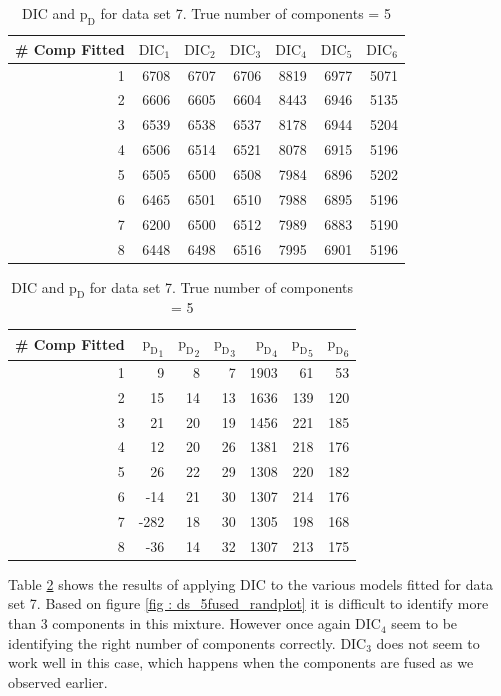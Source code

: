 \begin{table}[!htb]
\centering
\caption{DIC and $\text{p}_\text{D}$ for data set 7. True number of components = 5}
\label{table : ds_5fused_dic}
\begin{tabular}{@{}rrrrrrr@{}}
\toprule
\# Comp Fitted & $\text{DIC}_1$ & $\text{DIC}_2$  & $\text{DIC}_3$  & $\text{DIC}_4$  & $\text{DIC}_5$  & $\text{DIC}_6$  \\ \midrule
1 & 6708 & 6707 & 6706 & 8819 & 6977 & 5071 \\
2 & 6606 & 6605 & 6604 & 8443 & 6946 & 5135 \\
3 & 6539 & 6538 & 6537 & 8178 & 6944 & 5204 \\
4 & 6506 & 6514 & 6521 & 8078 & 6915 & 5196 \\
5 & 6505 & 6500 & 6508 & 7984 & 6896 & 5202 \\
6 & 6465 & 6501 & 6510 & 7988 & 6895 & 5196 \\
7 & 6200 & 6500 & 6512 & 7989 & 6883 & 5190 \\
8 & 6448 & 6498 & 6516 & 7995 & 6901 & 5196 \\ \bottomrule
\end{tabular}

\begin{tabular}{@{}rrrrrrr@{}}
\toprule
\# Comp Fitted & ${\text{p}_\text{D}}_1$ & ${\text{p}_\text{D}}_2$ & ${\text{p}_\text{D}}_3$ & ${\text{p}_\text{D}}_4$ & ${\text{p}_\text{D}}_5$ & ${\text{p}_\text{D}}_6$ \\ \midrule
1 & 9 & 8 & 7 & 1903 & 61 & 53 \\
2 & 15 & 14 & 13 & 1636 & 139 & 120 \\
3 & 21 & 20 & 19 & 1456 & 221 & 185 \\
4 & 12 & 20 & 26 & 1381 & 218 & 176 \\
5 & 26 & 22 & 29 & 1308 & 220 & 182 \\
6 & -14 & 21 & 30 & 1307 & 214 & 176 \\
7 & -282 & 18 & 30 & 1305 & 198 & 168 \\
8 & -36 & 14 & 32 & 1307 & 213 & 175 \\ \bottomrule
\end{tabular}
\end{table}

Table \ref{table : ds_5fused_dic} shows the results of applying DIC to the various models fitted for data set 7. Based on figure \ref{fig : ds_5fused_randplot} it is difficult to identify more than 3 components in this mixture. However once again $\text{DIC}_4$ seem to be identifying the right number of components correctly. $\text{DIC}_3$ does not seem to work well in this case, which happens when the components are fused as we observed earlier.

